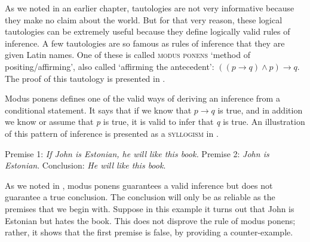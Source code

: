 As we noted in an earlier chapter, tautologies are not very informative because they make no claim about the world. But for that very reason, these logical tautologies can be extremely useful because they define logically valid rules of inference. A few tautologies are so famous as rules of inference that they are given Latin names. One of these is called \textsc{modus ponens} ‘method of positing/affirming’, also called ‘affirming the antecedent’: $((p\rightarrow q) \wedge p) \rightarrow q$. The proof of this tautology is presented in .



Modus ponens defines one of the valid ways of deriving an inference from a conditional statement. It says that if we know that $p\rightarrow q$ is true, and in addition we know or assume that \textit{p} is true, it is valid to infer that \textit{q} is true. An illustration of this pattern of inference is presented as a \textsc{syllogism} in .

\settowidth{}
\ea \label{ex:4.17}
Premise 1: \textit{If John is Estonian, he will like this book.}   
Premise 2: \textit{John is Estonian}.    
\FelixHRule
Conclusion: \textit{He will like this book}.   
\z


As we noted in , modus ponens guarantees a valid inference but does not guarantee a true conclusion. The conclusion will only be as reliable as the premises that we begin with. Suppose in this example it turns out that John is Estonian but hates the book. This does not disprove the rule of modus ponens; rather, it shows that the first premise is false, by providing a counter-example.



